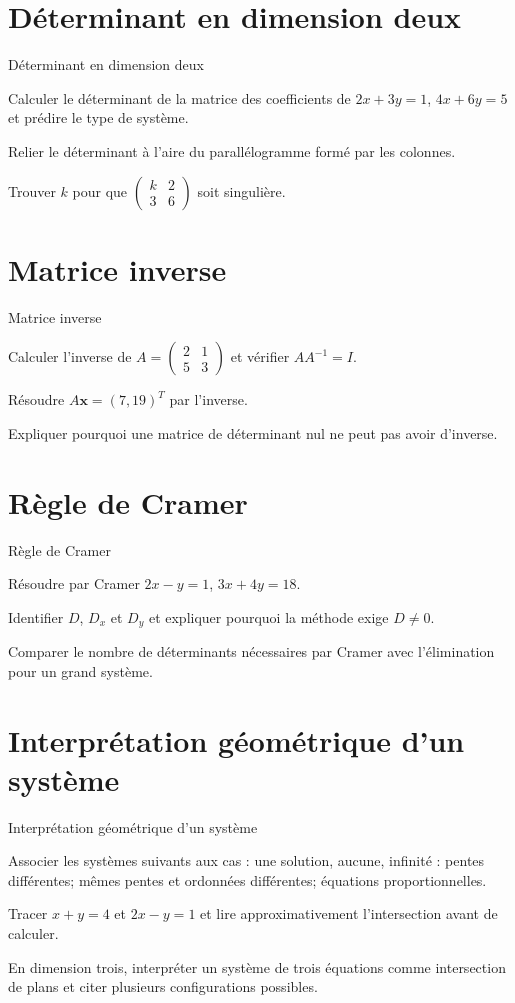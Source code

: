 \section{Déterminant en dimension deux}
\label{workbook:section:12.04}
\begin{exerciseblock}{Déterminant en dimension deux}
\item Calculer le déterminant de la matrice des coefficients de $2x+3y=1$, $4x+6y=5$ et prédire le type de système.
\item Relier le déterminant à l'aire du parallélogramme formé par les colonnes.
\item Trouver $k$ pour que $\begin{pmatrix}k&2\\3&6\end{pmatrix}$ soit singulière.
\end{exerciseblock}
\section{Matrice inverse}
\label{workbook:section:12.05}
\begin{exerciseblock}{Matrice inverse}
\item Calculer l'inverse de $A=\begin{pmatrix}2&1\\5&3\end{pmatrix}$ et vérifier $AA^{-1}=I$.
\item Résoudre $A\mathbf x=(7,19)^T$ par l'inverse.
\item Expliquer pourquoi une matrice de déterminant nul ne peut pas avoir d'inverse.
\end{exerciseblock}
\section{Règle de Cramer}
\label{workbook:section:12.06}
\begin{exerciseblock}{Règle de Cramer}
\item Résoudre par Cramer $2x-y=1$, $3x+4y=18$.
\item Identifier $D$, $D_x$ et $D_y$ et expliquer pourquoi la méthode exige $D\neq0$.
\item Comparer le nombre de déterminants nécessaires par Cramer avec l'élimination pour un grand système.
\end{exerciseblock}
\section{Interprétation géométrique d'un système}
\label{workbook:section:12.07}
\begin{exerciseblock}{Interprétation géométrique d'un système}
\item Associer les systèmes suivants aux cas : une solution, aucune, infinité : pentes différentes; mêmes pentes et ordonnées différentes; équations proportionnelles.
\item Tracer $x+y=4$ et $2x-y=1$ et lire approximativement l'intersection avant de calculer.
\item En dimension trois, interpréter un système de trois équations comme intersection de plans et citer plusieurs configurations possibles.
\end{exerciseblock}
